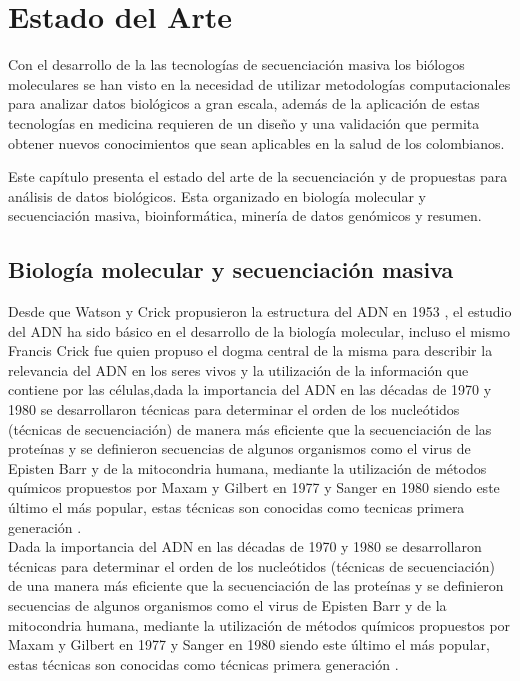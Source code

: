 \chapter{Estado del Arte}

Con el desarrollo de la las tecnologías de secuenciación masiva los biólogos moleculares se han visto en la necesidad  de utilizar metodologías computacionales para analizar datos biológicos a gran escala, además de la aplicación de estas tecnologías en medicina requieren de un diseño y una validación que permita obtener nuevos conocimientos que sean  aplicables en la salud de los colombianos.

Este capítulo presenta el estado del arte de la secuenciación y de propuestas para análisis de datos biológicos. Esta organizado en biología molecular y secuenciación masiva, bioinformática, minería de datos genómicos y resumen. 

\section{Biología molecular y secuenciación masiva}

Desde  que  Watson y Crick propusieron la estructura del ADN en 1953 \cite{Watson1953}, el estudio del ADN ha sido básico en el desarrollo de la biología molecular, incluso el mismo Francis Crick fue quien propuso el dogma central de la misma para describir la relevancia del ADN en los seres vivos y la utilización de la información que contiene por las células,dada la importancia del  ADN  en las décadas de 1970 y 1980 se desarrollaron  técnicas para determinar el orden de los nucleótidos  (técnicas de secuenciación) de manera más eficiente que la secuenciación de las proteínas y se definieron secuencias de algunos organismos como el virus de Episten Barr y  de la mitocondria humana, mediante la utilización de métodos químicos propuestos por Maxam y Gilbert en 1977 y Sanger en 1980 siendo este último el más popular, estas técnicas son conocidas como tecnicas primera generación \cite{Herraez2012}. \\

Dada la importancia del  ADN  en las décadas de 1970 y 1980 se desarrollaron  técnicas para determinar el orden de los nucleótidos  (técnicas de secuenciación) de una manera más eficiente que la secuenciación de las proteínas y se definieron secuencias de algunos organismos como el virus de Episten Barr y  de la mitocondria humana, mediante la utilización de métodos químicos propuestos por Maxam y Gilbert en 1977 y Sanger en 1980 siendo este último el más popular, estas técnicas son conocidas como técnicas primera generación \cite{Herraez2012}. \\

